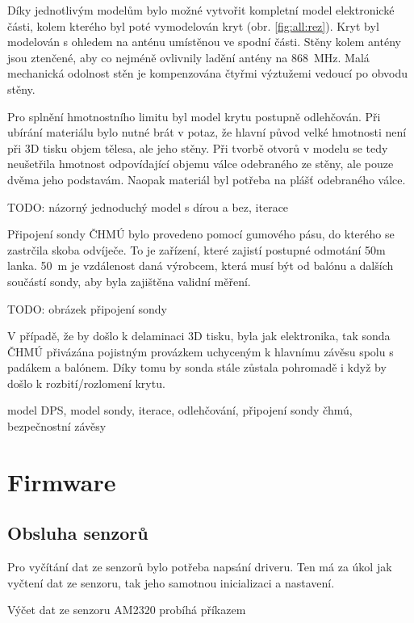 \documentclass[twoside]{ctuthesis}
\theoremstyle{plain}
\theoremstyle{definition}
\theoremstyle{note}
\begin{document}
	
	Díky jednotlivým modelům bylo možné vytvořit kompletní model elektronické části, kolem kterého byl poté vymodelován kryt (obr. \ref{fig:all:rez}). Kryt byl modelován s ohledem na anténu umístěnou ve spodní části. Stěny kolem antény jsou ztenčené, aby co nejméně ovlivnily ladění antény na 868~MHz. Malá mechanická odolnost stěn je kompenzována čtyřmi výztužemi vedoucí po obvodu stěny.

	Pro splnění hmotnostního limitu byl model krytu postupně odlehčován. Při ubírání materiálu bylo nutné brát v potaz, že hlavní původ velké hmotnosti není při 3D tisku objem tělesa, ale jeho stěny. Při tvorbě otvorů v modelu se tedy neušetřila hmotnost odpovídající objemu válce odebraného ze stěny, ale pouze dvěma jeho podstavám. Naopak materiál byl potřeba na plášť odebraného válce.

	TODO: názorný jednoduchý model s dírou a bez, iterace 

	Připojení sondy ČHMÚ bylo provedeno pomocí gumového pásu, do kterého se zastrčila skoba odvíječe. To je zařízení, které zajistí postupné odmotání 50m lanka. 50~m je vzdálenost daná výrobcem, která musí být od balónu a dalších součástí sondy, aby byla zajištěna validní měření.

	TODO: obrázek připojení sondy

	V případě, že by došlo k delaminaci 3D tisku, byla jak elektronika, tak sonda ČHMÚ přivázána pojistným provázkem uchyceným k hlavnímu závěsu spolu s padákem a balónem. Díky tomu by sonda stále zůstala pohromadě i když by došlo k rozbití/rozlomení krytu.

	model DPS, model sondy, iterace, odlehčování, připojení sondy čhmú, bezpečnostní závěsy










	\section{Firmware}
	
	\subsection{Obsluha senzorů}
	Pro vyčítání dat ze senzorů bylo potřeba napsání driveru. Ten má za úkol jak vyčtení dat ze senzoru, tak jeho samotnou inicializaci a nastavení. 

	Výčet dat ze senzoru AM2320 probíhá příkazem
	
\end{document}
